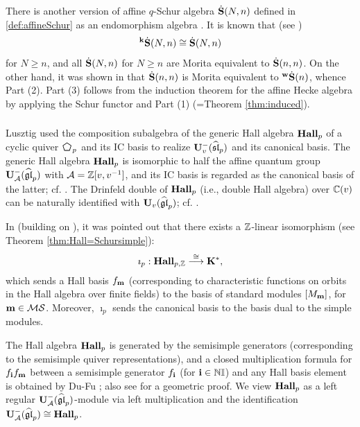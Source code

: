 There is another version of affine $q$-Schur algebra $\dot{\bf S}(N,n)$ defined in \eqref{def:affineSchur} as an endomorphism algebra \cite{Gre99}. It is known that (see \cite{LXY26}) 
\[
{}^{\bold{k}}\dot{\bold{S}}(N,n) \cong \dot{\bf S}(N,n)
\]
for $N\ge n$, and all $\dot{\bf S}(N,n)$ for $N\ge n$ are Morita equivalent to $\dot{\bf S}(n,n)$. On the other hand, it was shown in \cite{SSW25} that $\dot{\bf S}(n,n)$ is Morita equivalent to ${}^{\bold{w}}\dot{\bold{S}}(n)$, whence Part (2). Part (3) follows from the induction theorem for the affine Hecke algebra \cite{KL87, Ar96} by applying the Schur functor and Part (1) (=Theorem \ref{thm:induced}). 

\subsubsection{}
Lusztig \cite{Lus91, Lus98} used the composition subalgebra of the generic Hall algebra $\bold{Hall}_{p}$ of a cyclic quiver $\pen_p$ and its IC basis to realize $\bold{U}^-_v(\widehat{\mathfrak{sl}}_p)$ and its canonical basis. The generic Hall algebra $\bold{Hall}_{p}$ is isomorphic to half the affine quantum group $\bold{U}^-_{\mathcal{A}}(\widehat{\mathfrak{gl}}_p)$ with $\mathcal{A}=\mathbb{Z}[v,v^{-1}]$, and its IC basis is regarded as the canonical basis of the latter; cf. \cite{LT96, VV99}. The Drinfeld double of $\bold{Hall}_{p}$ (i.e., double Hall algebra) over $\mathbb{C}(v)$ can be naturally identified with $\bold{U}_v(\widehat{\mathfrak{gl}}_p)$; cf. \cite{X97, DF15, DX17}. 

In \cite[\S12.3]{VV99} (building on \cite{CG97, GV93, GRV94}), it was pointed out that there exists a $\mathbb{Z}$-linear isomorphism (see Theorem \ref{thm:Hall=Schursimple}):
\begin{align}  \label{Hall=K}
    \imath_p: \bold{Hall}_{p,\mathbb{Z}} \stackrel{\cong}{\longrightarrow} \bf{K}^*,
\end{align}
which sends a Hall basis $f_{\mathbf{m}}$ (corresponding to characteristic functions on orbits in the Hall algebra over finite fields) to the basis of standard modules $[M_{\mathbf{m}}]$, for $\mathbf{m}\in\mathcal{M}\mathcal{S}$. Moreover, $\imath_p$ sends the canonical basis to the basis dual to the simple modules. 

The Hall algebra $\bold{Hall}_{p}$ is generated by the semisimple generators (corresponding to the semisimple quiver representations), and a closed multiplication formula for $f_{\mathbf{i}} f_{\mathbf{m}}$ between a semisimple generator $f_{\mathbf{i}}$ (for $\mathbf{i}\in\mathbb{N}\mathbb{I}$) and any Hall basis element is obtained by Du-Fu \cite{DF15}; also see \cite{FL19} for a geometric proof. We view $\bold{Hall}_{p}$ as a left regular $\bold{U}_{\mathcal{A}}^-(\widehat{\mathfrak{gl}}_p)$-module via left multiplication and the identification $\bold{U}^-_{\mathcal{A}}(\widehat{\mathfrak{gl}}_p)\cong\bold{Hall}_{p}$. 

